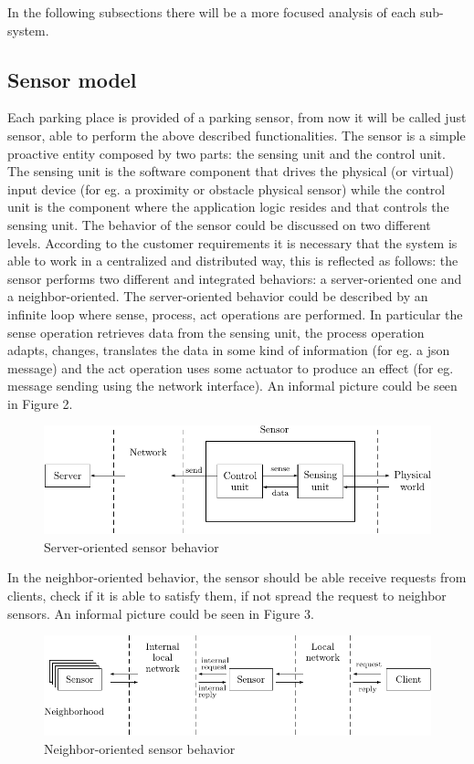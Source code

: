 \documentclass[11pt]{article}
\begin{document}
In the following subsections there will be a more focused analysis of each sub-system.
\subsection{Sensor model}
Each parking place is provided of a parking sensor, from now it will be called just sensor, able to perform the above described functionalities. The sensor is a simple proactive entity composed by two parts: the sensing unit and the control unit. The sensing unit is the software component that drives the physical (or virtual) input device (for eg. a proximity or obstacle physical sensor) while the control unit is the component where the application logic resides and that controls the sensing unit. The behavior of the sensor could be discussed on two different levels. According to the customer requirements it is necessary that the system is able to work in a centralized and distributed way, this is reflected as follows: the sensor performs two different and integrated behaviors: a server-oriented one and a neighbor-oriented. The server-oriented behavior could be described by an infinite loop where sense, process, act operations are performed. In particular the sense operation retrieves data from the sensing unit, the process operation adapts, changes, translates the data in some kind of information (for eg. a json message) and the act operation uses some actuator to produce an effect (for eg. message sending using the network interface). An informal picture could be seen in Figure 2.
\begin{figure}
  \centering
	\includegraphics[scale=1]{sensor_server_oriented_behavior}
  \caption{Server-oriented sensor behavior}
\end{figure}
In the neighbor-oriented behavior, the sensor should be able receive requests from clients, check if it is able to satisfy them, if not spread the request to neighbor sensors. An informal picture could be seen in Figure 3.
\begin{figure}
  \centering
	\includegraphics[scale=1]{sensor_neighbor_oriented_behavior}
  \caption{Neighbor-oriented sensor behavior}
\end{figure}
\end{document}
